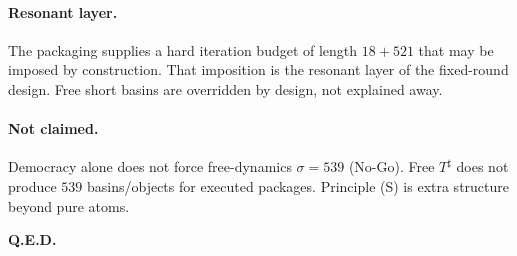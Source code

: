 \paragraph{Resonant layer.}
The packaging supplies a hard iteration budget of length \(18+521\) that may be imposed by construction. That imposition is the resonant layer of the fixed-round design. Free short basins are overridden by design, not explained away.

\paragraph{Not claimed.}
Democracy alone does not force free-dynamics \(\sigma=539\) (No-Go). Free \(T^{\sharp}\) does not produce \(539\) basins/objects for executed packages. Principle (S) is extra structure beyond pure atoms.

\bigskip
\noindent\textbf{Q.E.D.}
